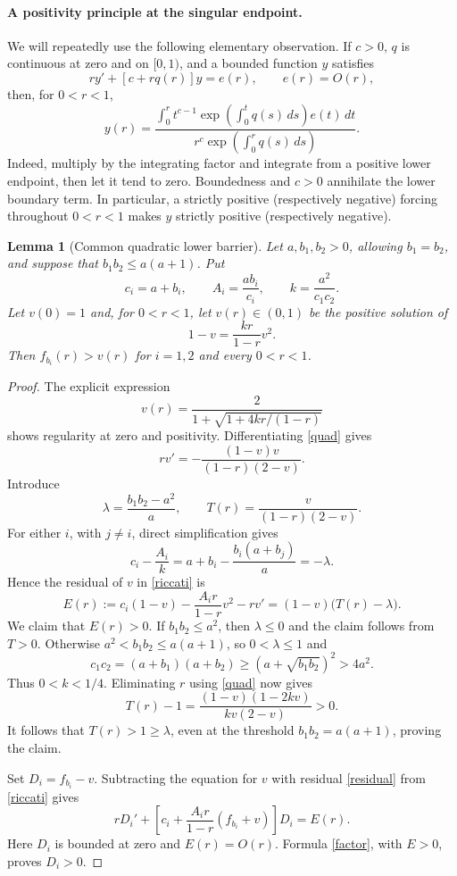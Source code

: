 \documentclass[11pt]{article}
\newtheorem{lemma}{Lemma}
\begin{document}
\paragraph{A positivity principle at the singular endpoint.}
We will repeatedly use the following elementary observation.
If \(c>0\), \(q\) is continuous at zero and on \([0,1)\), and
a bounded function \(y\) satisfies
\[
 r y'+[c+rq(r)]y=e(r),\qquad e(r)=O(r),
\]
then, for \(0<r<1\),
\begin{equation}\label{factor}
 y(r)=
 \frac{\displaystyle\int_0^r
 t^{c-1}\exp\!\left(\int_0^tq(s)\,ds\right)e(t)\,dt}
 {\displaystyle r^c\exp\!\left(\int_0^rq(s)\,ds\right)}.
\end{equation}
Indeed, multiply by the integrating factor and integrate from a positive
lower endpoint, then let it tend to zero. Boundedness and \(c>0\)
annihilate the lower boundary term.
In particular, a strictly positive (respectively negative) forcing
throughout \(0<r<1\) makes \(y\) strictly positive (respectively negative).

\begin{lemma}[Common quadratic lower barrier]\label{barrier}
Let \(a,b_1,b_2>0\), allowing \(b_1=b_2\), and suppose that
\(b_1b_2\le a(a+1)\). Put
\[
 c_i=a+b_i,\qquad A_i=\frac{ab_i}{c_i},\qquad
 k=\frac{a^2}{c_1c_2}.
\]
Let \(v(0)=1\) and, for \(0<r<1\), let \(v(r)\in(0,1)\) be the
positive solution of
\begin{equation}\label{quad}
 1-v=\frac{kr}{1-r}v^2.
\end{equation}
Then \(f_{b_i}(r)>v(r)\) for \(i=1,2\) and every \(0<r<1\).
\end{lemma}
\begin{proof}
The explicit expression
\[
 v(r)=\frac{2}{1+\sqrt{1+4kr/(1-r)}}
\]
shows regularity at zero and positivity. Differentiating \eqref{quad}
gives
\[
 rv'=-\frac{(1-v)v}{(1-r)(2-v)}.
\]
Introduce
\[
 \lambda=\frac{b_1b_2-a^2}{a},\qquad
 T(r)=\frac{v}{(1-r)(2-v)}.
\]
For either \(i\), with \(j\ne i\), direct simplification gives
\[
 c_i-\frac{A_i}{k}
 =a+b_i-\frac{b_i(a+b_j)}a=-\lambda .
\]
Hence the residual of \(v\) in \eqref{riccati} is
\begin{equation}\label{residual}
 E(r):=c_i(1-v)-\frac{A_i r}{1-r}v^2-rv'
 =(1-v)\bigl(T(r)-\lambda\bigr).
\end{equation}
We claim that \(E(r)>0\).
If \(b_1b_2\le a^2\), then \(\lambda\le0\) and the claim follows
from \(T>0\).
Otherwise \(a^2<b_1b_2\le a(a+1)\), so \(0<\lambda\le1\) and
\[
 c_1c_2=(a+b_1)(a+b_2)
 \ge (a+\sqrt{b_1b_2})^2>4a^2.
\]
Thus \(0<k<1/4\). Eliminating \(r\) using \eqref{quad} now gives
\begin{equation}\label{Tsign}
 T(r)-1
 =\frac{(1-v)(1-2kv)}{kv(2-v)}>0.
\end{equation}
It follows that \(T(r)>1\ge\lambda\), even at the threshold
\(b_1b_2=a(a+1)\), proving the claim.

Set \(D_i=f_{b_i}-v\). Subtracting the equation for \(v\) with
residual \eqref{residual} from \eqref{riccati} gives
\[
 rD_i'+
 \left[c_i+\frac{A_i r}{1-r}(f_{b_i}+v)\right]D_i=E(r).
\]
Here \(D_i\) is bounded at zero and \(E(r)=O(r)\).
Formula \eqref{factor}, with \(E>0\), proves \(D_i>0\).
\end{proof}
\end{document}
